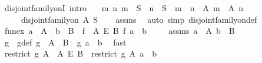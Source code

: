 \begin{isabellebody}
%
\endisadelimproof
\isanewline
{}\isamarkupfalse%
\ disjoint{\isacharunderscore}{\kern0pt}family{\isacharunderscore}{\kern0pt}onI\ {\isacharbrackleft}{\kern0pt}intro{\isacharbrackright}{\kern0pt}{\isacharcolon}{\kern0pt}\isanewline
\ \ \ {\isachardoublequoteopen}{\isasymAnd}m\ n{\isachardot}{\kern0pt}\ m\ {\isasymin}\ S\ {\isasymLongrightarrow}\ n\ {\isasymin}\ S\ {\isasymLongrightarrow}\ m\ {\isasymnoteq}\ n\ {\isasymLongrightarrow}\ A\ m\ {\isasyminter}\ A\ n\ {\isacharequal}{\kern0pt}\ {\isacharbraceleft}{\kern0pt}{\isacharbraceright}{\kern0pt}{\isachardoublequoteclose}\isanewline
\ \ \ \ \ {\isachardoublequoteopen}disjoint{\isacharunderscore}{\kern0pt}family{\isacharunderscore}{\kern0pt}on\ A\ S{\isachardoublequoteclose}\isanewline
%
\isadelimproof
\ \ %
\endisadelimproof
%
\isatagproof
{}\isamarkupfalse%
\ assms\ \isamarkupfalse%
\ {\isacharparenleft}{\kern0pt}auto\ simp{\isacharcolon}{\kern0pt}\ disjoint{\isacharunderscore}{\kern0pt}family{\isacharunderscore}{\kern0pt}on{\isacharunderscore}{\kern0pt}def{\isacharparenright}{\kern0pt}%
\endisatagproof
{\isafoldproof}%
%
\isadelimproof
\isanewline
%
\endisadelimproof
\isanewline
{}\isamarkupfalse%
\ fun{\isacharunderscore}{\kern0pt}ex{\isacharcolon}{\kern0pt}\ {\isachardoublequoteopen}a\ {\isasymin}\ A\ {\isasymLongrightarrow}\ b\ {\isasymin}\ B\ {\isasymLongrightarrow}\ {\isasymexists}f\ {\isasymin}\ A\ {\isasymrightarrow}\isactrlsub E\ B{\isachardot}{\kern0pt}\ f\ a\ {\isacharequal}{\kern0pt}\ b{\isachardoublequoteclose}\ \isanewline
%
\isadelimproof
%
\endisadelimproof
%
\isatagproof
{}\isamarkupfalse%
{\isacharminus}{\kern0pt}\isanewline
\ \ \isamarkupfalse%
\ assms{\isacharcolon}{\kern0pt}\ {\isachardoublequoteopen}a\ {\isasymin}\ A{\isachardoublequoteclose}\ {\isachardoublequoteopen}b\ {\isasymin}\ B{\isachardoublequoteclose}\isanewline
\ \ \isamarkupfalse%
\ \isamarkupfalse%
\ g\ \ g{\isacharunderscore}{\kern0pt}def{\isacharcolon}{\kern0pt}\ {\isachardoublequoteopen}g\ {\isasymin}\ A\ {\isasymrightarrow}\ B\ {\isasymand}\ g\ a\ {\isacharequal}{\kern0pt}\ b{\isachardoublequoteclose}\ \isamarkupfalse%
\ fast\isanewline
\ \ \isamarkupfalse%
\ \isamarkupfalse%
\ {\isachardoublequoteopen}restrict\ g\ A\ {\isasymin}\ A\ {\isasymrightarrow}\isactrlsub E\ B\ {\isasymand}\ {\isacharparenleft}{\kern0pt}restrict\ g\ A{\isacharparenright}{\kern0pt}\ a\ {\isacharequal}{\kern0pt}\ b{\isachardoublequoteclose}\ \isamarkupfalse%

\end{isabellebody}
